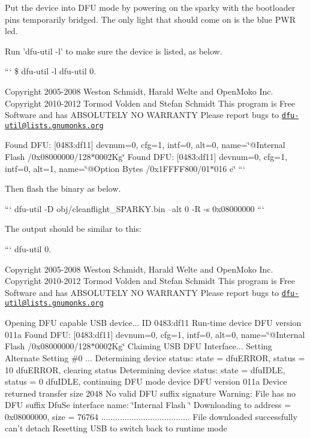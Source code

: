 Put the device into D\+F\+U mode by powering on the sparky with the bootloader pins temporarily bridged. The only light that should come on is the blue P\+W\+R led.

Run 'dfu-\/util -\/l' to make sure the device is listed, as below.

``` \$ dfu-\/util -\/l dfu-\/util 0.

Copyright 2005-\/2008 Weston Schmidt, Harald Welte and Open\+Moko Inc. Copyright 2010-\/2012 Tormod Volden and Stefan Schmidt This program is Free Software and has A\+B\+S\+O\+L\+U\+T\+E\+L\+Y N\+O W\+A\+R\+R\+A\+N\+T\+Y Please report bugs to \href{mailto:dfu-util@lists.gnumonks.org}{\tt dfu-\/util@lists.\+gnumonks.\+org}

Found D\+F\+U\+: \mbox{[}0483\+:df11\mbox{]} devnum=0, cfg=1, intf=0, alt=0, name=\char`\"{}@\+Internal Flash  /0x08000000/128$\ast$0002\+Kg\char`\"{} Found D\+F\+U\+: \mbox{[}0483\+:df11\mbox{]} devnum=0, cfg=1, intf=0, alt=1, name=\char`\"{}@\+Option Bytes  /0x1\+F\+F\+F\+F800/01$\ast$016 e\char`\"{} ```

Then flash the binary as below.

``` dfu-\/util -\/\+D obj/cleanflight\+\_\+\+S\+P\+A\+R\+K\+Y.\+bin --alt 0 -\/\+R -\/s 0x08000000 ```

The output should be similar to this\+:

``` dfu-\/util 0.

Copyright 2005-\/2008 Weston Schmidt, Harald Welte and Open\+Moko Inc. Copyright 2010-\/2012 Tormod Volden and Stefan Schmidt This program is Free Software and has A\+B\+S\+O\+L\+U\+T\+E\+L\+Y N\+O W\+A\+R\+R\+A\+N\+T\+Y Please report bugs to \href{mailto:dfu-util@lists.gnumonks.org}{\tt dfu-\/util@lists.\+gnumonks.\+org}

Opening D\+F\+U capable U\+S\+B device... I\+D 0483\+:df11 Run-\/time device D\+F\+U version 011a Found D\+F\+U\+: \mbox{[}0483\+:df11\mbox{]} devnum=0, cfg=1, intf=0, alt=0, name=\char`\"{}@\+Internal Flash  /0x08000000/128$\ast$0002\+Kg\char`\"{} Claiming U\+S\+B D\+F\+U Interface... Setting Alternate Setting \#0 ... Determining device status\+: state = dfu\+E\+R\+R\+O\+R, status = 10 dfu\+E\+R\+R\+O\+R, clearing status Determining device status\+: state = dfu\+I\+D\+L\+E, status = 0 dfu\+I\+D\+L\+E, continuing D\+F\+U mode device D\+F\+U version 011a Device returned transfer size 2048 No valid D\+F\+U suffix signature Warning\+: File has no D\+F\+U suffix Dfu\+Se interface name\+: \char`\"{}\+Internal Flash  \char`\"{} Downloading to address = 0x08000000, size = 76764 ...................................... File downloaded successfully can't detach Resetting U\+S\+B to switch back to runtime mode

